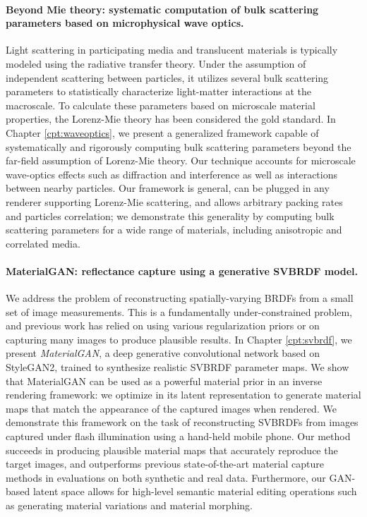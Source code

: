 \paragraph{Beyond Mie theory: systematic computation of bulk scattering parameters based on microphysical wave optics.}
Light scattering in participating media and translucent materials is typically modeled using the radiative transfer theory. Under the assumption of independent scattering between particles, it utilizes several bulk scattering parameters to statistically characterize light-matter interactions at the macroscale. To calculate these parameters based on microscale material properties, the Lorenz-Mie theory has been considered the gold standard.
In Chapter \ref{cpt:waveoptics}, we present a generalized framework capable of systematically and rigorously computing bulk scattering parameters beyond the far-field assumption of Lorenz-Mie theory. Our technique accounts for microscale wave-optics effects such as diffraction and interference as well as interactions between nearby particles. Our framework is general, can be plugged in any renderer supporting Lorenz-Mie scattering, and allows arbitrary packing rates and particles correlation; we demonstrate this generality by computing bulk scattering parameters for a wide range of materials, including anisotropic and correlated media.

\paragraph{MaterialGAN: reflectance capture using a generative SVBRDF model.}
We address the problem of reconstructing spatially-varying BRDFs from a small set of image measurements. This is a fundamentally under-constrained problem, and previous work has relied on using various regularization priors or on capturing many images to produce plausible results.
In Chapter \ref{cpt:svbrdf}, we present \emph{MaterialGAN}, a deep generative convolutional network based on StyleGAN2, trained to synthesize realistic SVBRDF parameter maps. We show that MaterialGAN can be used as a powerful material prior in an inverse rendering framework: we optimize in its latent representation to generate material maps that match the appearance of the captured images when rendered. We demonstrate this framework on the task of reconstructing SVBRDFs from images captured under flash illumination using a hand-held mobile phone. Our method succeeds in producing plausible material maps that accurately reproduce the target images, and outperforms previous state-of-the-art material capture methods in evaluations on both synthetic and real data. Furthermore, our GAN-based latent space allows for high-level semantic material editing operations such as generating material variations and material morphing.

